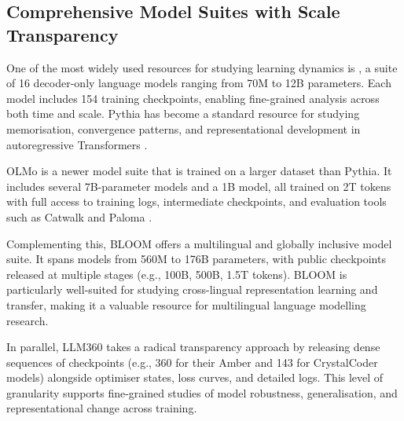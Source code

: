 
\subsection{Comprehensive Model Suites with Scale Transparency}

One of the most widely used resources for studying learning dynamics is  \citep{biderman2023pythia}, a suite of 16 decoder-only language models ranging from 70M to 12B parameters. Each model includes 154 training checkpoints, enabling fine-grained analysis across both time and scale. Pythia has become a standard resource for studying memorisation, convergence patterns, and representational development in autoregressive Transformers \citep{lesci2024causal,godey2024anisotropy,belrose2023eliciting}.

OLMo \citep{groeneveld2024olmo} is a newer model suite that is trained on a larger dataset than Pythia. It includes several 7B-parameter models and a 1B model, all trained on 2T tokens with full access to training logs, intermediate checkpoints, and evaluation tools such as Catwalk \citep{groeneveld2023catwalk} and Paloma \citep{magnusson2024paloma}.

Complementing this, BLOOM \citep{le2023bloom} offers a multilingual and globally inclusive model suite. It spans models from 560M to 176B parameters, with public checkpoints released at multiple stages (e.g., 100B, 500B, 1.5T tokens). BLOOM is particularly well-suited for studying cross-lingual representation learning and transfer, making it a valuable resource for multilingual language modelling research.

In parallel, LLM360 \citep{liu2023llm360} takes a radical transparency approach by releasing dense sequences of checkpoints (e.g., 360 for their Amber and 143 for CrystalCoder models) alongside optimiser states, loss curves, and detailed logs. This level of granularity supports fine-grained studies of model robustness, generalisation, and representational change across training.

